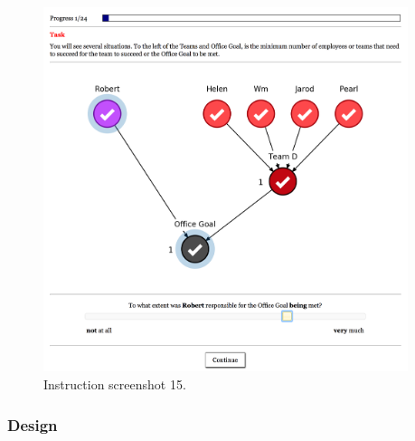 \documentclass[11pt]{article}
\begin{document}
\begin{figure}[H]
	\centering
	\includegraphics[width=0.95\textwidth]{screenshot_15}
	\caption{Instruction screenshot 15.}
	\label{fig:screenshot_15}
\end{figure}

\subsubsection{Design}
\label{ssub:design}

\begin{figure}[H]
\renewcommand{\thesubfigure}{\arabic{subfigure}}
\centering
{\hfill}
\hfill
{}
\hfill
{}
\hfill
{}
{\hfill}
\end{figure}
\end{document}
